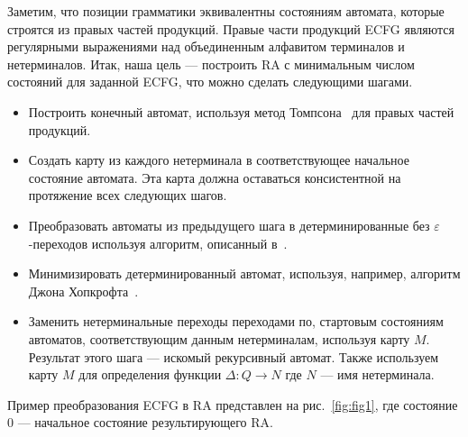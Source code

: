 \documentclass[14pt]{matmex-diploma-custom}
\begin{document}
	Заметим, что позиции грамматики эквивалентны состояниям автомата, которые 
	строятся из правых частей продукций. Правые части продукций ECFG являются регулярными
	выражениями над объединенным алфавитом терминалов и нетерминалов. Итак, наша цель ---
	построить RA с минимальным числом состояний для заданной ECFG, что можно сделать следующими шагами.
	\begin{itemize}
		\item Построить конечный автомат, используя метод Томпсона~\cite{Thompson:1968:PTR:363347.363387} для правых
		частей продукций.
		\item Создать карту из каждого нетерминала в соответствующее начальное состояние автомата.
		Эта карта должна оставаться консистентной на протяжение всех следующих шагов.
		\item Преобразовать автоматы из предыдущего шага в детерминированные без 
		$\varepsilon$-переходов используя алгоритм, описанный в~\cite{aho1974design}.
		\item Минимизировать детерминированный автомат, используя, например, алгоритм
		Джона Хопкрофта~\cite{hopcroft1971n}.
		\item Заменить нетерминальные переходы переходами по, стартовым состояниям автоматов,
		соответствующим данным нетерминалам, используя карту $M$. Результат 
		этого шага --- искомый рекурсивный автомат. Также используем карту $M$
		для определения функции $\Delta : Q \to N$ где $N$ --- имя нетерминала.
	\end{itemize}
	Пример преобразования ECFG в RA представлен на рис.~\ref{fig:fig1}, где состояние
	0 --- начальное состояние результирующего RA.
\end{document}
